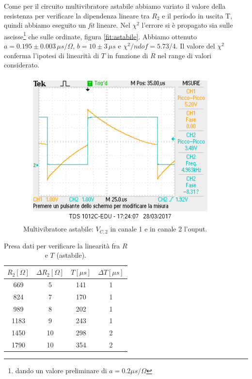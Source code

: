 \documentclass[10pt,a4paper]{article}
\begin{document}
Come per il circuito multivibratore astabile abbiamo variato il valore della resistenza per verificare la dipendenza lineare tra $R_2$ e il periodo in uscita T, quindi abbiamo eseguito un \emph{fit} lineare. Nel $\chi^2$ l'errore si è propagato sia sulle ascisse\footnote{dando un valore preliminare di $a = 0.2 \mu s/\Omega$} che sulle ordinate, figura \ref{fit:astabile}. Abbiamo ottenuto $a=0.195\pm0.003\,\mu s/\Omega$, $b=10\pm3\,\mu s$ e $\chi^2/ndof=5.73/4$. Il valore del $\chi^2$ conferma l'ipotesi di linearità di $T$ in funzione di $R$ nel range di valori considerato.
\begin{figure}[!htb]
  \centering
  \includegraphics[scale=0.75]{astabile1vc2out.png}
\caption{Multivibratore astabile: $V_{C,2}$ in canale 1 e in canale 2 l'ouput.\label{osc:astabile}}
\end{figure}





\begin{table}[!htb]
\centering
\begin{tabular}{|c|c|c|c|}
\hline 
$R_2 [\Omega]$ & $\Delta R_2 [\Omega]$ & $T [\mu s]$ & $\Delta T [\mu s]$\\
\hline
 669 & 5 & 141  & 1\\ 
\hline
 824 &  7 & 170 & 1\\ 
\hline 
 989 &  8 & 202 & 1\\ 
\hline
 1183 &  9 & 243 & 1\\ 
\hline
 1450 &  10 & 298 & 2\\ 
\hline
 1790 & 10 & 354 & 2 \\
 \hline
\end{tabular} 
\caption{Presa dati per verificare la linearità fra $R$ e $T$ (astabile).\label{tab:astabile}}
\end{table}
\end{document}
